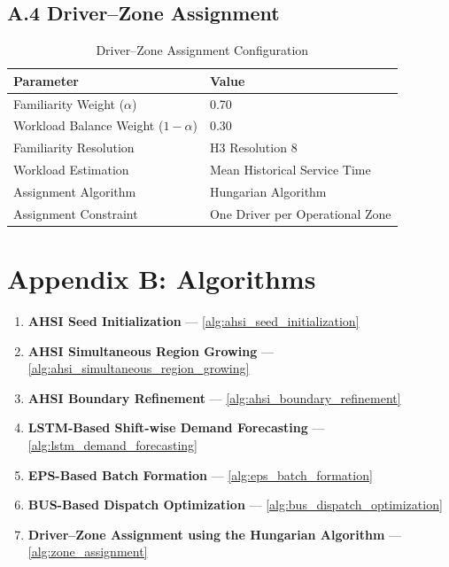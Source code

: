 \documentclass{article}
\begin{document}
\subsection*{A.4 Driver--Zone Assignment}
\begin{table}[htbp]
\centering
\caption{Driver--Zone Assignment Configuration}
\label{tab:driver_zone_config}
\begin{tabular}{ll}
\toprule
\textbf{Parameter} & \textbf{Value} \\
\midrule
Familiarity Weight ($\alpha$) & 0.70 \\
Workload Balance Weight ($1 - \alpha$) & 0.30 \\
Familiarity Resolution & H3 Resolution 8 \\
Workload Estimation & Mean Historical Service Time \\
Assignment Algorithm & Hungarian Algorithm \\
Assignment Constraint & One Driver per Operational Zone \\
\bottomrule
\end{tabular}
\end{table}

\newpage

\section*{Appendix B: Algorithms}

\begin{enumerate}
    \item \textbf{AHSI Seed Initialization} --- \ref{alg:ahsi_seed_initialization}
    \item \textbf{AHSI Simultaneous Region Growing} --- \ref{alg:ahsi_simultaneous_region_growing}
    \item \textbf{AHSI Boundary Refinement} --- \ref{alg:ahsi_boundary_refinement}
    \item \textbf{LSTM-Based Shift-wise Demand Forecasting} --- \ref{alg:lstm_demand_forecasting}
    \item \textbf{EPS-Based Batch Formation} --- \ref{alg:eps_batch_formation}
    \item \textbf{BUS-Based Dispatch Optimization} --- \ref{alg:bus_dispatch_optimization}
    \item \textbf{Driver–Zone Assignment using the Hungarian Algorithm} --- \ref{alg:zone_assignment}
\end{enumerate} 
\end{document}
